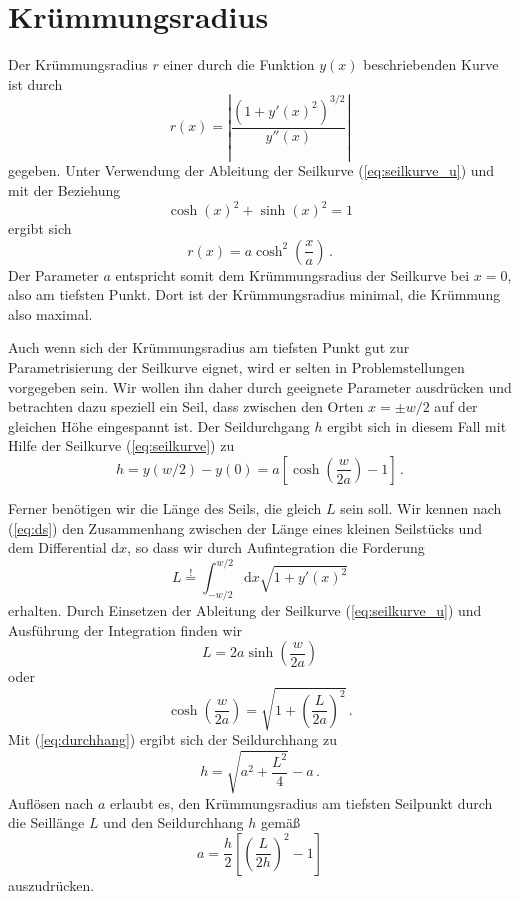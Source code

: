 \documentclass[twocolumn,aps]{revtex4}
\begin{document}
\section{Krümmungsradius}
Der Krümmungsradius $r$ einer durch die Funktion $y(x)$ beschriebenden
Kurve ist durch
\begin{equation}
 r(x) = \left\vert\frac{(1+y'(x)^2)^{3/2}}{y''(x)}\right\vert
\end{equation}
gegeben. Unter Verwendung der Ableitung der Seilkurve
(\ref{eq:seilkurve_u}) und mit der Beziehung
\begin{equation}
 \cosh(x)^2+\sinh(x)^2 = 1
\end{equation}
ergibt sich
\begin{equation}
 r(x) = a\cosh^2\left(\frac{x}{a}\right)\,.
\end{equation}
Der Parameter $a$ entspricht somit dem Krümmungsradius der Seilkurve
bei $x=0$, also am tiefsten Punkt. Dort ist der Krümmungsradius
minimal, die Krümmung also maximal.

Auch wenn sich der Krümmungsradius am tiefsten Punkt gut zur
Parametrisierung der Seilkurve eignet, wird er selten in
Problemstellungen vorgegeben sein. Wir wollen ihn daher durch
geeignete Parameter ausdrücken und betrachten dazu speziell ein
Seil, dass zwischen den Orten $x=\pm w/2$ auf der gleichen Höhe
eingespannt ist. Der Seildurchgang $h$ ergibt sich in diesem Fall mit
Hilfe der Seilkurve (\ref{eq:seilkurve}) zu
\begin{equation}
 h = y(w/2)-y(0) = a\left[\cosh\left(\frac{w}{2a}\right)-1\right]\,.
 \label{eq:durchhang}
\end{equation}

Ferner benötigen wir die Länge des Seils, die gleich $L$ sein soll.
Wir kennen nach (\ref{eq:ds}) den Zusammenhang zwischen der Länge
eines kleinen Seilstücks und dem Differential $\mathrm{d}x$, so dass
wir durch Auf\/integration die Forderung
\begin{equation}
 L \overset{!}{=} \int_{-w/2}^{w/2}\mathrm{d}x\sqrt{1+y'(x)^2}
\end{equation}
erhalten. Durch Einsetzen der Ableitung der Seilkurve
(\ref{eq:seilkurve_u}) und Ausführung der Integration finden wir
\begin{equation}
 L = 2a\sinh\left(\frac{w}{2a}\right)
\end{equation}
oder
\begin{equation}
 \cosh\left(\frac{w}{2a}\right) = \sqrt{1+\left(\frac{L}{2a}\right)^2}\,.
\end{equation}
Mit (\ref{eq:durchhang}) ergibt sich der Seildurchhang zu
\begin{equation}
 h = \sqrt{a^2+\frac{L^2}{4}}-a\,.
\end{equation}
Auf\/lösen nach $a$ erlaubt es, den Krümmungsradius am tiefsten
Seilpunkt durch die Seillänge $L$ und den Seildurchhang $h$ gemäß
\begin{equation}
 a = \frac{h}{2}\left[\left(\frac{L}{2h}\right)^2-1\right]
\end{equation}
auszudrücken.
\end{document}
